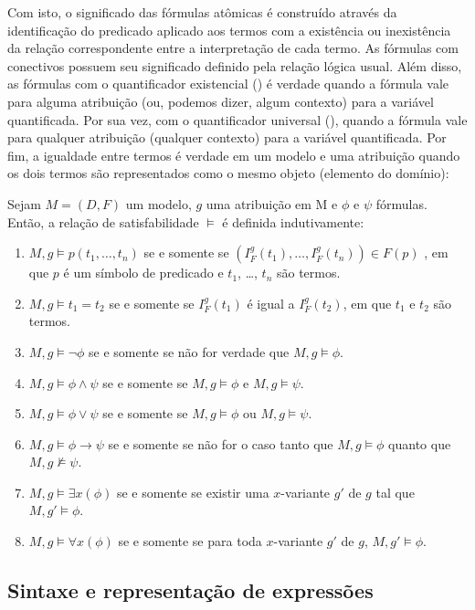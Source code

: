 Com isto, o significado das fórmulas atômicas é construído através da identificação do predicado aplicado aos termos com a existência ou inexistência da relação correspondente entre a interpretação de cada termo. As fórmulas com conectivos possuem seu significado definido pela relação lógica usual. Além disso, as fórmulas com o quantificador existencial (\expr{$\exists$}) é verdade quando a fórmula vale para alguma atribuição (ou, podemos dizer, algum contexto) para a variável quantificada. Por sua vez, com o quantificador universal (\expr{$\forall$}), quando a fórmula vale para qualquer atribuição (qualquer contexto) para a variável quantificada. Por fim, a igualdade entre termos é verdade em um modelo e uma atribuição quando os dois termos são representados como o mesmo objeto (elemento do domínio):

\begin{defn}[Satisfação]
Sejam $M = (D,F)$ um modelo, $g$ uma atribuição em M e $\phi$ e $\psi$ fórmulas. Então, a relação de satisfabilidade $\models$ é definida indutivamente:
\begin{enumerate}
\item $M,g \models p(t_1,\dots,t_n)$ se e somente se $(I_F^g(t_1), \dots, I_F^g(t_n)) \in F(p)$ , em que $p$ é um símbolo de predicado e $t_1$, \dots, $t_n$ são termos.
\item $M, g \models t_1 = t_2$ se e somente se $I_F^g(t_1)$ é igual a $I_ F^g(t_2)$, em que $t_1$ e $t_2$ são termos.
\item $M,g \models \neg \phi$ se e somente se não for verdade que $M, g \models \phi$.
\item $M,g \models \phi \land \psi$ se e somente se $M, g \models \phi$ e $M, g \models \psi$.
\item $M,g \models \phi \lor \psi$ se e somente se $M, g \models \phi$ ou $M, g \models \psi$.
\item $M,g \models \phi \rightarrow \psi$ se e somente se não for o caso tanto que $M,g \models \phi$ quanto que $M,g \not \models \psi$.
\item $M,g \models \exists x (\phi)$ se e somente se existir uma $x$-variante $g'$ de $g$ tal que $M,g' \models \phi$.
\item $M,g \models \forall x (\phi)$ se e somente se para toda $x$-variante $g'$ de $g$, $M,g' \models \phi$.
\end{enumerate}
\end{defn}

\update

\subsection{Sintaxe e representação de expressões}


